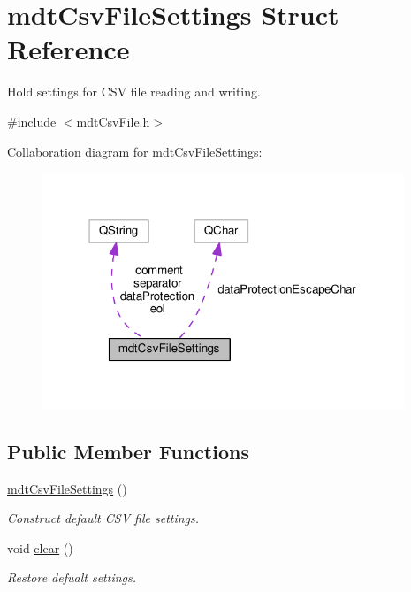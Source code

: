\hypertarget{structmdt_csv_file_settings}{\section{mdt\-Csv\-File\-Settings Struct Reference}
\label{structmdt_csv_file_settings}
}


Hold settings for C\-S\-V file reading and writing.  




{\ttfamily \#include $<$mdt\-Csv\-File.\-h$>$}



Collaboration diagram for mdt\-Csv\-File\-Settings\-:\nopagebreak
\begin{figure}[H]
\begin{center}
\leavevmode
\includegraphics[width=307pt]{structmdt_csv_file_settings__coll__graph}
\end{center}
\end{figure}
\subsection*{Public Member Functions}
\begin{DoxyCompactItemize}
\item 
\hyperlink{structmdt_csv_file_settings_a560b5e5349fabaebf2cd9fa33fa8b710}{mdt\-Csv\-File\-Settings} ()
\begin{DoxyCompactList}\small\item\em Construct default C\-S\-V file settings. \end{DoxyCompactList}\item 
void \hyperlink{structmdt_csv_file_settings_ad303ac43045c830d10638361240ffd03}{clear} ()
\begin{DoxyCompactList}\small\item\em Restore defualt settings. \end{DoxyCompactList}\end{DoxyCompactItemize}
